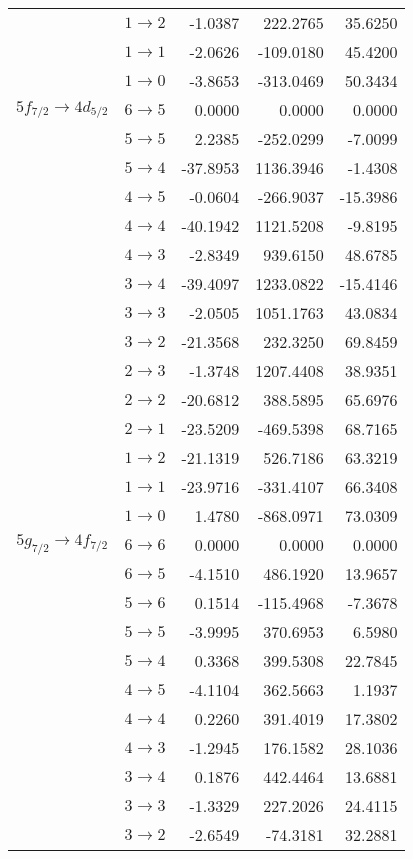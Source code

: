 \begin{longtable}{cc|rrr}
 & $1 \rightarrow 2$ &-1.0387&222.2765&35.6250\\
 & $1 \rightarrow 1$ &-2.0626&-109.0180&45.4200\\
 & $1 \rightarrow 0$ &-3.8653&-313.0469&50.3434\\[4pt]
$5f_{7/2} \rightarrow 4d_{5/2}$ & $6 \rightarrow 5$ &0.0000&0.0000&0.0000\\
 & $5 \rightarrow 5$ &2.2385&-252.0299&-7.0099\\
 & $5 \rightarrow 4$ &-37.8953&1136.3946&-1.4308\\
 & $4 \rightarrow 5$ &-0.0604&-266.9037&-15.3986\\
 & $4 \rightarrow 4$ &-40.1942&1121.5208&-9.8195\\
 & $4 \rightarrow 3$ &-2.8349&939.6150&48.6785\\
 & $3 \rightarrow 4$ &-39.4097&1233.0822&-15.4146\\
 & $3 \rightarrow 3$ &-2.0505&1051.1763&43.0834\\
 & $3 \rightarrow 2$ &-21.3568&232.3250&69.8459\\
 & $2 \rightarrow 3$ &-1.3748&1207.4408&38.9351\\
 & $2 \rightarrow 2$ &-20.6812&388.5895&65.6976\\
 & $2 \rightarrow 1$ &-23.5209&-469.5398&68.7165\\
 & $1 \rightarrow 2$ &-21.1319&526.7186&63.3219\\
 & $1 \rightarrow 1$ &-23.9716&-331.4107&66.3408\\
 & $1 \rightarrow 0$ &1.4780&-868.0971&73.0309\\[4pt]
$5g_{7/2} \rightarrow 4f_{7/2}$ & $6 \rightarrow 6$ &0.0000&0.0000&0.0000\\
 & $6 \rightarrow 5$ &-4.1510&486.1920&13.9657\\
 & $5 \rightarrow 6$ &0.1514&-115.4968&-7.3678\\
 & $5 \rightarrow 5$ &-3.9995&370.6953&6.5980\\
 & $5 \rightarrow 4$ &0.3368&399.5308&22.7845\\
 & $4 \rightarrow 5$ &-4.1104&362.5663&1.1937\\
 & $4 \rightarrow 4$ &0.2260&391.4019&17.3802\\
 & $4 \rightarrow 3$ &-1.2945&176.1582&28.1036\\
 & $3 \rightarrow 4$ &0.1876&442.4464&13.6881\\
 & $3 \rightarrow 3$ &-1.3329&227.2026&24.4115\\
 & $3 \rightarrow 2$ &-2.6549&-74.3181&32.2881\\

\end{longtable}
